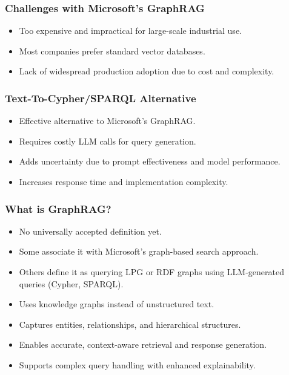 \begin{frame}[fragile]\frametitle{Challenges with Microsoft’s GraphRAG}
    \begin{itemize}
        \item Too expensive and impractical for large-scale industrial use.
        \item Most companies prefer standard vector databases.
        \item Lack of widespread production adoption due to cost and complexity.
    \end{itemize}
\end{frame}

\begin{frame}[fragile]\frametitle{Text-To-Cypher/SPARQL Alternative}
    \begin{itemize}
        \item Effective alternative to Microsoft’s GraphRAG.
        \item Requires costly LLM calls for query generation.
        \item Adds uncertainty due to prompt effectiveness and model performance.
        \item Increases response time and implementation complexity.
    \end{itemize}
\end{frame}

\begin{frame}[fragile]\frametitle{What is GraphRAG?}
    \begin{itemize}
        \item No universally accepted definition yet.
        \item Some associate it with Microsoft’s graph-based search approach.
        \item Others define it as querying LPG or RDF graphs using LLM-generated queries (Cypher, SPARQL).	
        \item Uses knowledge graphs instead of unstructured text.
        \item Captures entities, relationships, and hierarchical structures.
        \item Enables accurate, context-aware retrieval and response generation.
        \item Supports complex query handling with enhanced explainability.
    \end{itemize}
\end{frame}

